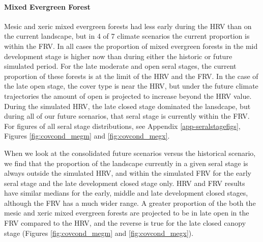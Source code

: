 \documentclass[12pt]{article}
\begin{document}
\begin{spacing}{1}
\paragraph{Mixed Evergreen Forest} Mesic and xeric mixed evergreen forests had less early during the HRV than on the current landscape, but in 4 of 7 climate scenarios the current proportion is within the FRV. In all cases the proportion of mixed evergreen forests in the mid development stage is higher now than during either the historic or future simulated period. For the late moderate and open seral stages, the current proportion of these forests is at the limit of the HRV and the FRV. In the case of the late open stage, the cover type is near the HRV, but under the future climate trajectories the amount of open is projected to increase beyond the HRV value. During the simulated HRV, the late closed stage dominated the lansdcape, but during all of our future scenarios, that seral stage is currently within the FRV. For figures of all seral stage distributions, see Appendix \ref{app-seralstagefigs}, Figures \ref{fig:covcond_megm} and \ref{fig:covcond_megx}.

When we look at the consolidated future scenarios versus the historical scenario, we find that the proportion of the landscape currently in a given seral stage is always outside the simulated HRV, and within the simulated FRV for the early seral stage and the late development closed stage only. HRV and FRV results have similar medians for the early, middle and late development closed stages, although the FRV has a much wider range. A greater proportion of the both the mesic and xeric mixed evergreen forests are projected to be in late open in the FRV compared to the HRV, and the reverse is true for the late closed canopy stage (Figures \ref{fig:covcond_megm} and \ref{fig:covcond_megx}).



\end{spacing}
\end{document}
